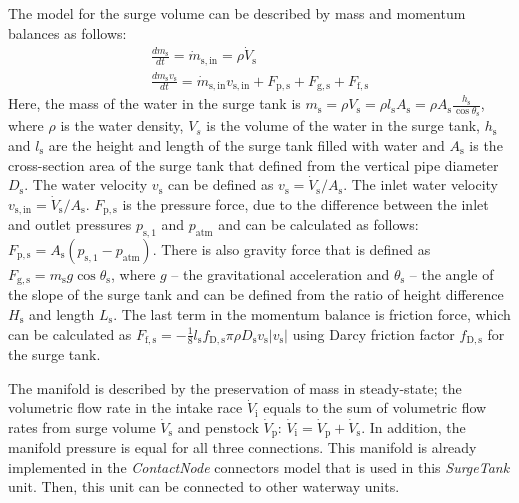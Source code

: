 \documentclass[%
]{USN-PhD}
\begin{document}
The model for the surge volume can be described by mass and momentum balances as follows:
\begin{equation}
\begin{array}{c}
\frac{dm_\mathrm{s}}{dt} = \dot{m}_\mathrm{s,in} = \rho \dot{V}_\mathrm{s}\\
\frac{dm_\mathrm{s}v_\mathrm{s}}{dt} =\dot{m}_\mathrm{s,in}v_\mathrm{s,in}+F_\mathrm{p,s}+F_\mathrm{g,s}+F_\mathrm{f,s}
\end{array}
\end{equation}
Here, the mass of the water in the surge tank is $m_\mathrm{s}=\rho V_\mathrm{s}=\rho l_\mathrm{s}A_\mathrm{s}=\rho A_\mathrm{s}\frac{h_\mathrm{s}}{\cos\theta_\mathrm{s}}$, where $\rho$ is the water density, $V_s$ is the volume of the water in the surge tank, $h_\mathrm{s}$ and $l_\mathrm{s}$ are the height and length of the surge tank filled with water and $A_\mathrm{s}$ is the cross-section area of the surge tank that defined from the vertical pipe diameter $D_\mathrm{s}$.  The water velocity $v_\mathrm{s}$ can be defined as $v_\mathrm{s}=\dot{V}_\mathrm{s}/A_\mathrm{s}$. The inlet water velocity $v_\mathrm{s,in}=\dot{V}_\mathrm{s}/A_\mathrm{s}$. $F_\mathrm{p,s}$ is the pressure force, due to the difference between the inlet and outlet pressures $p_\mathrm{s,1}$ and $p_\mathrm{atm}$ and can be calculated as follows: $F_\mathrm{p,s}=A_\mathrm{s}\left(p_\mathrm{s,1}-p_\mathrm{atm}\right)$. There is also gravity force that is defined as $F_\mathrm{g,s}=m_\mathrm{s}g\cos\theta_\mathrm{s}$, where $g$ -- the gravitational acceleration and $\theta_\mathrm{s}$ -- the angle of the slope of the surge tank and can be defined from the ratio of height difference $H_\mathrm{s}$ and length $L_\mathrm{s}$. The last term in the momentum balance is friction force, which can be calculated as $F_\mathrm{f,s}=-\frac{1}{8}l_\mathrm{s}f_\mathrm{D,s}\pi\rho D_\mathrm{s}v_\mathrm{s}|v_\mathrm{s}|$ using Darcy friction factor $f_\mathrm{D,s}$ for the surge tank.

The manifold is described by the preservation of mass in steady-state; the volumetric flow rate in the intake race $\dot{V}_\mathrm{i}$ equals to the sum of volumetric flow rates from surge volume $\dot{V}_\mathrm{s}$ and penstock $\dot{V}_\mathrm{p}$: $\dot{V}_\mathrm{i}=\dot{V}_\mathrm{p}+\dot{V}_\mathrm{s}$. In addition, the manifold pressure is equal for all three connections. This manifold is already implemented in the \emph{ContactNode} connectors model that is used in this \emph{SurgeTank} unit. Then, this unit can be connected to other waterway units.
\end{document}
